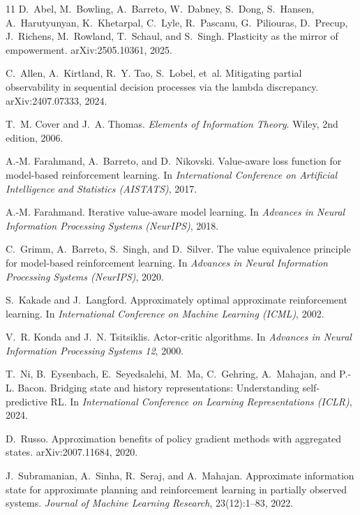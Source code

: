 \documentclass{article}
\newcounter{algo}
\theoremstyle{definition}
\begin{document}
\begin{thebibliography}{11}
D.~Abel, M.~Bowling, A.~Barreto, W.~Dabney, S.~Dong, S.~Hansen, A.~Harutyunyan, K.~Khetarpal, C.~Lyle, R.~Pascanu, G.~Piliouras, D.~Precup, J.~Richens, M.~Rowland, T.~Schaul, and S.~Singh.
\newblock Plasticity as the mirror of empowerment.
\newblock arXiv:2505.10361, 2025.

C.~Allen, A.~Kirtland, R.~Y. Tao, S.~Lobel, et~al.
\newblock Mitigating partial observability in sequential decision processes via the lambda discrepancy.
\newblock arXiv:2407.07333, 2024.

T.~M. Cover and J.~A. Thomas.
\newblock \emph{Elements of Information Theory}.
\newblock Wiley, 2nd edition, 2006.

A.-M. Farahmand, A.~Barreto, and D.~Nikovski.
\newblock Value-aware loss function for model-based reinforcement learning.
\newblock In \emph{International Conference on Artificial Intelligence and Statistics (AISTATS)}, 2017.

A.-M. Farahmand.
\newblock Iterative value-aware model learning.
\newblock In \emph{Advances in Neural Information Processing Systems (NeurIPS)}, 2018.

C.~Grimm, A.~Barreto, S.~Singh, and D.~Silver.
\newblock The value equivalence principle for model-based reinforcement learning.
\newblock In \emph{Advances in Neural Information Processing Systems (NeurIPS)}, 2020.

S.~Kakade and J.~Langford.
\newblock Approximately optimal approximate reinforcement learning.
\newblock In \emph{International Conference on Machine Learning (ICML)}, 2002.

V.~R. Konda and J.~N. Tsitsiklis.
\newblock Actor-critic algorithms.
\newblock In \emph{Advances in Neural Information Processing Systems 12}, 2000.

T.~Ni, B.~Eysenbach, E.~Seyedsalehi, M.~Ma, C.~Gehring, A.~Mahajan, and P.-L. Bacon.
\newblock Bridging state and history representations: Understanding self-predictive RL.
\newblock In \emph{International Conference on Learning Representations (ICLR)}, 2024.

D.~Russo.
\newblock Approximation benefits of policy gradient methods with aggregated states.
\newblock arXiv:2007.11684, 2020.

J.~Subramanian, A.~Sinha, R.~Seraj, and A.~Mahajan.
\newblock Approximate information state for approximate planning and reinforcement learning in partially observed systems.
\newblock \emph{Journal of Machine Learning Research}, 23(12):1--83, 2022.
\end{thebibliography}
\end{document}
